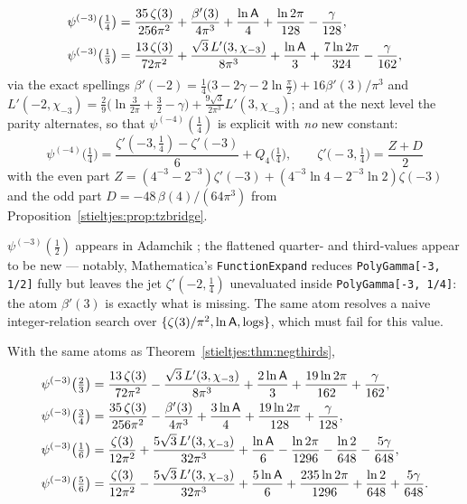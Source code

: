 \begin{theorem}[third- and quarter-argument values at $n=3,4$]
\label{stieltjes:thm:negthirds}
\begin{align*}
\psi^{(-3)}\bigl(\tfrac14\bigr)
&=\frac{35\,\zeta(3)}{256\pi^2}+\frac{\beta'(3)}{4\pi^3}
+\frac{\ln\mathsf{A}}{4}+\frac{\ln2\pi}{128}-\frac{\gamma}{128},\\
\psi^{(-3)}\bigl(\tfrac13\bigr)
&=\frac{13\,\zeta(3)}{72\pi^2}+\frac{\sqrt3\,L'(3,\chi_{-3})}{8\pi^3}
+\frac{\ln\mathsf{A}}{3}+\frac{7\ln2\pi}{324}-\frac{\gamma}{162},
\end{align*}
via the exact spellings
$\beta'(-2)=\tfrac14\bigl(3-2\gamma-2\ln\tfrac\pi2\bigr)+16\beta'(3)/\pi^3$
and
$L'(-2,\chi_{-3})=\tfrac29\bigl(\ln\tfrac3{2\pi}+\tfrac32-\gamma\bigr)
+\tfrac{9\sqrt3}{2\pi^3}L'(3,\chi_{-3})$;
and at the next level the parity alternates, so that
$\psi^{(-4)}(\tfrac14)$ is explicit with \emph{no} new constant:
\[
\psi^{(-4)}\bigl(\tfrac14\bigr)
=\frac{\zeta'(-3,\tfrac14)-\zeta'(-3)}{6}+Q_4\bigl(\tfrac14\bigr),
\qquad
\zeta'\bigl(-3,\tfrac14\bigr)
=\frac{Z+D}{2}
\]
with the even part
$Z=(4^{-3}-2^{-3})\zeta'(-3)+(4^{-3}\ln4-2^{-3}\ln2)\zeta(-3)$ and the odd
part $D=-48\,\beta(4)/(64\pi^3)$ from Proposition~\ref{stieltjes:prop:tzbridge}.
\end{theorem}

\begin{remark}
$\psi^{(-3)}(\tfrac12)$ appears in Adamchik \cite{stieltjes:Adamchik98}; the
flattened quarter- and third-values appear to be new — notably,
Mathematica's \texttt{FunctionExpand} reduces
\texttt{PolyGamma[-3,\,1/2]} fully but leaves the jet
$\zeta'(-2,\tfrac14)$ unevaluated inside \texttt{PolyGamma[-3,\,1/4]}: the
atom $\beta'(3)$ is exactly what is missing. The same atom resolves a
naive integer-relation search over $\{\zeta(3)/\pi^2,
\ln\mathsf{A},\text{logs}\}$, which must fail for this value.
\end{remark}

\begin{corollary}
\label{stieltjes:cor:psi3companions}
With the same atoms as Theorem~\ref{stieltjes:thm:negthirds},
\begin{align*}
\psi^{(-3)}\bigl(\tfrac23\bigr)
&=\frac{13\,\zeta(3)}{72\pi^2}-\frac{\sqrt3\,L'(3,\chi_{-3})}{8\pi^3}
+\frac{2\ln\mathsf{A}}{3}+\frac{19\ln2\pi}{162}+\frac{\gamma}{162},\\
\psi^{(-3)}\bigl(\tfrac34\bigr)
&=\frac{35\,\zeta(3)}{256\pi^2}-\frac{\beta'(3)}{4\pi^3}
+\frac{3\ln\mathsf{A}}{4}+\frac{19\ln2\pi}{128}+\frac{\gamma}{128},\\
\psi^{(-3)}\bigl(\tfrac16\bigr)
&=\frac{\zeta(3)}{12\pi^2}+\frac{5\sqrt3\,L'(3,\chi_{-3})}{32\pi^3}
+\frac{\ln\mathsf{A}}{6}-\frac{\ln2\pi}{1296}-\frac{\ln2}{648}
-\frac{5\gamma}{648},\\
\psi^{(-3)}\bigl(\tfrac56\bigr)
&=\frac{\zeta(3)}{12\pi^2}-\frac{5\sqrt3\,L'(3,\chi_{-3})}{32\pi^3}
+\frac{5\ln\mathsf{A}}{6}+\frac{235\ln2\pi}{1296}+\frac{\ln2}{648}
+\frac{5\gamma}{648}.
\end{align*}
\end{corollary}

